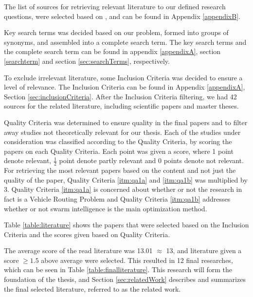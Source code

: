 The list of sources for retrieving relevant literature to our defined research questions, were selected based on \citep[p.3]{kofod2014}, and can be found in Appendix \vref{appendixB}. 

Key search terms was decided based on our problem, formed into groups of synonyms, and assembled into a complete search term. The key search terms and the complete search term can be found in appendix \ref{appendixA}, section \vref{searchterm} and section \vref{sec:searchTerms}, respectively.

To exclude irrelevant literature, some Inclusion Criteria was decided to ensure a level of relevance. The Inclusion Criteria can be found in Appendix \ref{appendixA}, Section \ref{sec:inclusionCriteria}. After the Inclusion Criteria filtering, we had 42 sources for the related literature, including scientific papers and master theses. 

Quality Criteria was determined to ensure quality in the final papers and to filter away studies not theoretically relevant for our thesis. Each of the studies under consideration was classified according to the Quality Criteria, by scoring the papers on each Quality Criteria. Each point was given a score, where 1 point denote relevant, $\frac{1}{2}$ point denote partly relevant and 0 points denote not relevant. For retrieving the most relevant papers based on the content and not just the quality of the paper, Quality Criteria \ref{itm:qa1a} and \vref{itm:qa1b} was multiplied by 3. Quality Criteria \ref{itm:qa1a} is concerned about whether or not the research in fact is a Vehicle Routing Problem and Quality Criteria \ref{itm:qa1b} addresses whether or not swarm intelligence is the main optimization method. 

Table \vref{table:literature} shows the papers that were selected based on the Inclusion Criteria and the scores given based on Quality Criteria.

The average score of the read literature was 13.01 $\approx$ 13, and literature given a score $\geq{1.5}$ above average were selected. This resulted in 12 final researches, which can be seen in Table \vref{table:finalliterature}. This research will form the foundation of the thesis, and Section \vref{sec:relatedWork} describes and summarizes the final selected literature, referred to as the related work. 
